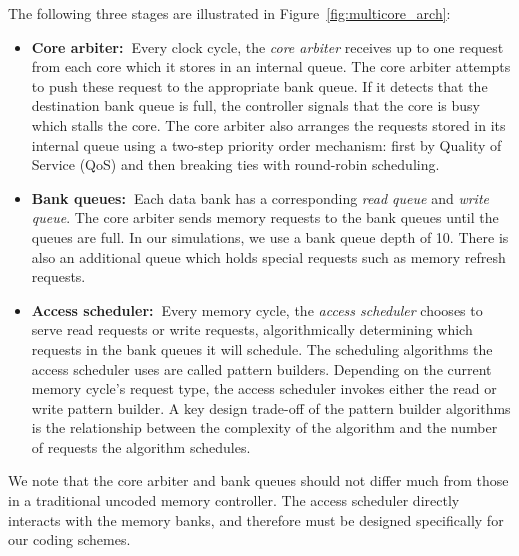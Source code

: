 The following three stages are illustrated in Figure~\ref{fig:multicore_arch}:
\begin{itemize}
\item \textbf{Core arbiter:~}Every clock cycle, the \textit{core arbiter} receives up to one request from each core which it stores in an internal queue. The core arbiter attempts to push these request to the appropriate bank queue. If it detects that the destination bank queue is full, the controller signals that the core is busy which stalls the core. The core arbiter also arranges the requests stored in its internal queue using a two-step priority order mechanism: first by Quality of Service (QoS) and then breaking ties with round-robin scheduling.

\item \textbf{Bank queues:~}Each data bank has a corresponding \textit{read queue} and \textit{write queue}.  The core arbiter sends memory requests to the bank queues until the queues are full. In our simulations, we use a bank queue depth of 10. There is also an additional queue which holds special requests such as memory refresh requests.

\item \textbf{Access scheduler:~}Every memory cycle, the \textit{access scheduler} chooses to serve read requests or write requests, algorithmically determining which requests in the bank queues it will schedule. The scheduling algorithms the access scheduler uses are called pattern builders. Depending on the current memory cycle's request type, the access scheduler invokes either the read or write pattern builder. A key design trade-off of the pattern builder algorithms is the relationship between the complexity of the algorithm and the number of requests the algorithm schedules.
\end{itemize}

We note that the core arbiter and bank queues should not differ much from those in a traditional uncoded memory controller. The access scheduler directly interacts with the memory banks, and therefore must be designed specifically for our coding schemes.


